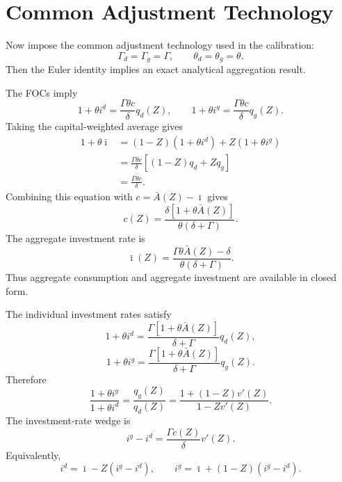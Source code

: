 \documentclass[11pt]{article}
\newcommand{\Abar}{\bar A}
\newcommand{\ibar}{\bar\imath}
\begin{document}
\section{Common Adjustment Technology}

Now impose the common adjustment technology used in the calibration:
\begin{equation}
    \Gamma_d=\Gamma_g=\Gamma,
    \qquad
    \theta_d=\theta_g=\theta.
\end{equation}
Then the Euler identity implies an exact analytical aggregation result.

The FOCs imply
\begin{equation}
    1+\theta i^d
    =
    \frac{\Gamma\theta c}{\delta}q_d(Z),
    \qquad
    1+\theta i^g
    =
    \frac{\Gamma\theta c}{\delta}q_g(Z).
\end{equation}
Taking the capital-weighted average gives
\begin{align}
    1+\theta\ibar
    &=
    (1-Z)(1+\theta i^d)+Z(1+\theta i^g) \\
    &=
    \frac{\Gamma\theta c}{\delta}
    \left[(1-Z)q_d+Zq_g\right] \\
    &=
    \frac{\Gamma\theta c}{\delta}.
\end{align}
Combining this equation with $c=\Abar(Z)-\ibar$ gives
\begin{equation}
    \boxed{
    c(Z)
    =
    \frac{\delta\left[1+\theta\Abar(Z)\right]}{\theta(\delta+\Gamma)}.
    }
\end{equation}
The aggregate investment rate is
\begin{equation}
    \boxed{
    \ibar(Z)
    =
    \frac{\Gamma\theta\Abar(Z)-\delta}{\theta(\delta+\Gamma)}.
    }
\end{equation}
Thus aggregate consumption and aggregate investment are available in closed form.

The individual investment rates satisfy
\begin{equation}
    \boxed{
    1+\theta i^d
    =
    \frac{\Gamma\left[1+\theta\Abar(Z)\right]}{\delta+\Gamma}q_d(Z),
    }
\end{equation}
\begin{equation}
    \boxed{
    1+\theta i^g
    =
    \frac{\Gamma\left[1+\theta\Abar(Z)\right]}{\delta+\Gamma}q_g(Z).
    }
\end{equation}
Therefore
\begin{equation}
    \boxed{
    \frac{1+\theta i^g}{1+\theta i^d}
    =
    \frac{q_g(Z)}{q_d(Z)}
    =
    \frac{1+(1-Z)v'(Z)}{1-Zv'(Z)}.
    }
\end{equation}
The investment-rate wedge is
\begin{equation}
    \boxed{
    i^g-i^d
    =
    \frac{\Gamma c(Z)}{\delta}v'(Z).
    }
\end{equation}
Equivalently,
\begin{equation}
    \boxed{
    i^d=\ibar-Z(i^g-i^d),
    \qquad
    i^g=\ibar+(1-Z)(i^g-i^d).
    }
\end{equation}
\end{document}
